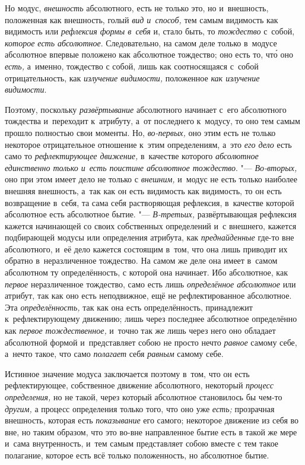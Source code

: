 Но модус, {\em внешность} абсолютного, есть не только
это, но и~внешность, положенная как внешность, голый
{\em вид и~способ,} тем самым видимость как видимость
или {\em рефлексия формы в~себя} и, стало быть, то {\em тождество} с~собой,
{\em которое есть абсолютное}. Следовательно, на самом
деле только в~модусе абсолютное впервые положено как абсолютное тождество;
оно есть то, чт\'{о} оно {\em есть,} а~именно, тождество с
собой, лишь как соотносящаяся с~собой отрицательность, как
{\em излучение видимости,} положенное {\em как излучение видимости}.

Поэтому, поскольку {\em развёртывание} абсолютного
начинает с~его абсолютного тождества и~переходит к~атрибуту, а~от
последнего к~модусу, то оно тем самым прошло полностью свои моменты. Но,
{\em во-первых,} оно этим есть не только некоторое
отрицательное отношение к~этим определениям, а~это {\em его дело} есть само то
{\em рефлектирующее движение,} в~качестве которого
{\em абсолютное единственно только и~есть поистине
абсолютное тождество}. "--- {\em Во-вторых,} оно при этом
имеет дело не только с {\em внешним,} и~модус не есть
только наиболее внешняя внешность, а~так как он есть видимость как
видимость, то он есть возвращение в~себя, та сама себя растворяющая
рефлексия, в~качестве которой абсолютное есть абсолютное бытие. "---
{\em В-третьих,} развёртывающая рефлексия кажется
начинающей со своих собственных определений и~с внешнего, кажется
подбирающей модусы или определения атрибута, как
{\em преднайденные} где-то вне абсолютного, и~её дело
кажется состоящим в~том, что она лишь приводит их обратно в~неразличенное
тождество. На самом же деле она имеет в~самом абсолютном ту определённость,
с которой она начинает. Ибо абсолютное, как
{\em первое} неразличенное тождество, само есть лишь
{\em определённое абсолютное} или атрибут, так как оно
есть неподвижное, ещё не рефлектированное абсолютное. Эта
{\em определённость,} так как она есть определённость,
принадлежит к~рефлектирующему движению; лишь через последнее абсолютное
определённо как {\em первое тождественное,} и~точно так
же лишь через него оно обладает абсолютной формой и~представляет собою не
просто нечто {\em равное} самому себе, а~нечто такое,
что само {\em полагает} себя
{\em равным} самому себе.

Истинное значение модуса заключается поэтому в~том, что он есть
рефлектирующее, собственное движение абсолютного, некоторый
{\em процесс определения,} но не такой, через который
абсолютное становилось бы чем-то {\em другим,} а
процесс определения только того, что оно уже
{\em есть;} прозрачная внешность, которая есть
{\em показывание} его самого; некоторое движение из
себя во вне, но таким образом, что это во-вне направленное бытие есть в
такой же мере и~сама внутренность, и~тем самым представляет собою вместе с
тем такое полагание, которое есть всё только положенность, но абсолютное бытие.

